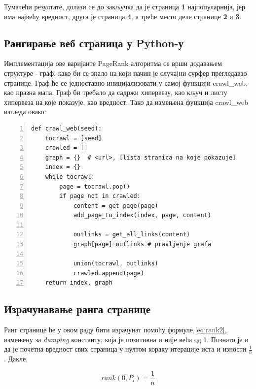 Тумачећи резултате, долази се до закључка да је страница \textbf{1} најпопуларнија, јер има највећу вредност, друга је страница \textbf{4}, а треће место деле странице \textbf{2} и \textbf{3}.

\subsection{Рангирање веб страница у Python-у}

Имплементација ове варијанте PageRank\texttrademark{} алгоритма
се врши додавањем структуре - граф, како би се знало на који начин је случајни
сурфер
прегледавао странице. Граф ће се једноставно иницијализовати у
самој функцији crawl\_web, као празна мапа. Граф би требало да садржи
хипервезу, као кључ и листу хипервеза на које показује, као вредност. Тако да измењена функција crawl\_web изгледа овако:

\begin{lstlisting}[caption=Увођење графа у crawl\_web, label={lst:graph}, numbers=left]
def crawl_web(seed):
    tocrawl = [seed]
    crawled = []
    graph = {}  # <url>, [lista stranica na koje pokazuje]
    index = {}
    while tocrawl:
        page = tocrawl.pop()
        if page not in crawled:
            content = get_page(page)
            add_page_to_index(index, page, content)

            outlinks = get_all_links(content)
            graph[page]=outlinks # pravljenje grafa

            union(tocrawl, outlinks)
            crawled.append(page)
    return index, graph
\end{lstlisting}

\subsection{Израчунавање ранга странице}

Ранг странице ће у овом раду бити израчунат помоћу формуле \ref{eq:rank2}, измењену за \emph{dumping} константу, која је позитивна и није већа од 1. Познато је и да је почетна вредност свих страница у нултом кораку итерације иста и изности $\frac{1}{n}$. Дакле,

\begin{equation}\label{eq:zero}
rank(0, P_{i})=\frac{1}{n}
\end{equation}

